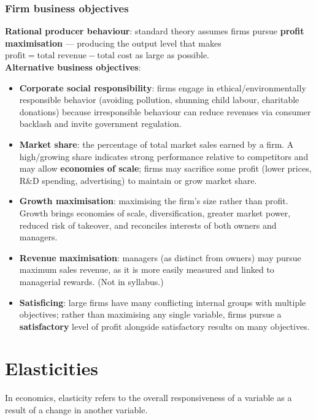 \subsubsection*{Firm business objectives}
\textbf{Rational producer behaviour}: standard theory assumes firms pursue \textbf{profit maximisation} --- producing the output level that makes $\text{profit} = \text{total revenue} - \text{total cost}$ as large as possible.
\\
\textbf{Alternative business objectives}:
\begin{itemize}
  \item \textbf{Corporate social responsibility}: firms engage in ethical/environmentally responsible behavior (avoiding pollution, shunning child labour, charitable donations) because irresponsible behaviour can reduce revenues via consumer backlash and invite government regulation.
  \item \textbf{Market share}: the percentage of total market sales earned by a firm. A high/growing share indicates strong performance relative to competitors and may allow \textbf{economies of scale}; firms may sacrifice some profit (lower prices, R\&D spending, advertising) to maintain or grow market share.
  \item \textbf{Growth maximisation}: maximising the firm's size rather than profit. Growth brings economies of scale, diversification, greater market power, reduced risk of takeover, and reconciles interests of both owners and managers.
  \item \textbf{Revenue maximisation}: managers (as distinct from owners) may pursue maximum sales revenue, as it is more easily measured and linked to managerial rewards. (Not in syllabus.)
  \item \textbf{Satisficing}: large firms have many conflicting internal groups with multiple objectives; rather than maximising any single variable, firms pursue a \textbf{satisfactory} level of profit alongside satisfactory results on many objectives.
\end{itemize}
\section{Elasticities}
In economics, elasticity refers to the overall responsiveness of a variable as a result of a change in another variable.
